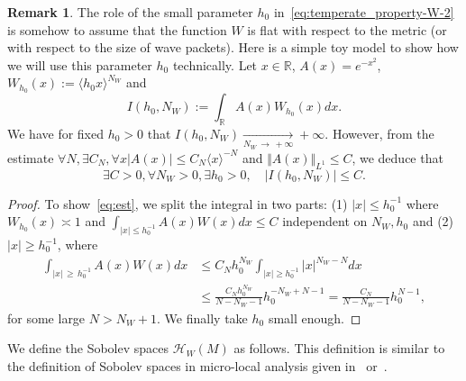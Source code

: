 \documentclass[10pt]{amsart}
\theoremstyle{definition}\newtheorem{defi}[theo]{Definition}\newtheorem{rema}[theo]{Remark}\newtheorem{exam}[theo]{Example}\newtheorem{exem}[theo]{Example}\newtheorem{nota}[theo]{Notation}
\newcommand{\clH}{\mathcal{H}}
\newcommand{\bbR}{\mathbb{R}}
\let\oldexists\exists
\renewcommand*{\exists}{\mathrel{\oldexists}}
\let\oldforall\forall
\renewcommand*{\forall}{\mathrel{\oldforall}}
\begin{document}
\begin{rema}\label{rem:h0-model}
The role of the small parameter $h_{0}$ in~\eqref{eq:temperate_property-W-2} is somehow to assume that the function $W$ is flat with respect to the metric (or with respect to the size of wave packets). Here is a simple toy model to show how we will use this parameter $h_{0}$ technically. Let $x\in\bbR$, $A(x)=e^{-x^{2}}$, $W_{h_{0}}(x):=\langle h_{0}x\rangle ^{N_{W}}$ and
\[
I\left(h_{0},N_{W}\right):=\int_{\bbR}A\left(x\right)W_{h_{0}}\left(x\right)dx.
\]
We have for fixed $h_{0}>0$ that $I(h_{0},N_{W})\underset{N_{W}\,\rightarrow\,+\infty}{\rightarrow}+\infty$. However, from the estimate $\forall N,\exists C_{N},\forall x|A(x)|\leq C_{N}\langle x\rangle ^{-N}$ and $\Vert A(x)\Vert _{L^{1}}\leq C$, we deduce that
\begin{equation}
\exists C>0,\forall N_{W}>0,\exists h_{0}>0,\quad\left|I\left(h_{0},N_{W}\right)\right|\leq C.\label{eq:est}
\end{equation}
\begin{proof}
To show~\eqref{eq:est}, we split the integral in two parts: (1) $|x|\leq h_{0}^{-1}$ where $W_{h_{0}}(x){\asymp}1$ and $\int_{|x|\leq h_{0}^{-1}}A(x)W(x)dx\leq C$ independent on $N_{W},h_{0}$ and (2) $|x|\geq h_{0}^{-1}$, where
\begin{align*}
\int_{\left|x\right|\,\geq\,h_{0}^{-1}}A\left(x\right)W\left(x\right)dx & \leq C_{N}h_{0}^{N_{W}}\int_{\left|x\right|\geq h_{0}^{-1}}\left|x\right|^{N_{W}-N}dx\\
& \leq\frac{C_{N}h_{0}^{N_{W}}}{N-N_{W}-1}h_{0}^{-N_{W}+N-1}=\frac{C_{N}}{N-N_{W}-1}h_{0}^{N-1},
\end{align*}
for some large $N>N_{W}+1$. We finally take $h_{0}$ small enough.
\end{proof}
\end{rema}



We define the Sobolev spaces $\clH _{W}(M)$ as follows. This definition is similar to the definition of Sobolev spaces in micro-local analysis given in~\cite[Defi.2.6.1]{lerner2011metrics} or~\cite[Section~1.7.4]{nicola_rodino_livre_11}.
\end{document}
